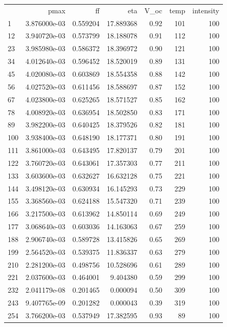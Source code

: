 \documentclass[a4paper,12pt]{article}
\begin{document}
\begin{tabular}{lrrrrrr}

{} &          pmax &        ff &        eta &  V\_oc &  temp &  intensity \\

1   &  3.876000e-03 &  0.559204 &  17.889368 &  0.92 &   101 &        100 \\
12  &  3.940720e-03 &  0.573799 &  18.188078 &  0.91 &   112 &        100 \\
23  &  3.985980e-03 &  0.586372 &  18.396972 &  0.90 &   121 &        100 \\
34  &  4.012640e-03 &  0.596452 &  18.520019 &  0.89 &   131 &        100 \\
45  &  4.020080e-03 &  0.603869 &  18.554358 &  0.88 &   142 &        100 \\
56  &  4.027520e-03 &  0.611456 &  18.588697 &  0.87 &   152 &        100 \\
67  &  4.023800e-03 &  0.625265 &  18.571527 &  0.85 &   162 &        100 \\
78  &  4.008920e-03 &  0.636954 &  18.502850 &  0.83 &   171 &        100 \\
89  &  3.982200e-03 &  0.640425 &  18.379526 &  0.82 &   181 &        100 \\
100 &  3.938400e-03 &  0.648190 &  18.177371 &  0.80 &   191 &        100 \\
111 &  3.861000e-03 &  0.643495 &  17.820137 &  0.79 &   201 &        100 \\
122 &  3.760720e-03 &  0.643061 &  17.357303 &  0.77 &   211 &        100 \\
133 &  3.603600e-03 &  0.632627 &  16.632128 &  0.75 &   221 &        100 \\
144 &  3.498120e-03 &  0.630934 &  16.145293 &  0.73 &   229 &        100 \\
155 &  3.368560e-03 &  0.624188 &  15.547320 &  0.71 &   239 &        100 \\
166 &  3.217500e-03 &  0.613962 &  14.850114 &  0.69 &   249 &        100 \\
177 &  3.068640e-03 &  0.603036 &  14.163063 &  0.67 &   259 &        100 \\
188 &  2.906740e-03 &  0.589728 &  13.415826 &  0.65 &   269 &        100 \\
199 &  2.564520e-03 &  0.539375 &  11.836337 &  0.63 &   279 &        100 \\
210 &  2.281200e-03 &  0.498756 &  10.528696 &  0.61 &   289 &        100 \\
221 &  2.037600e-03 &  0.464001 &   9.404380 &  0.59 &   299 &        100 \\
232 &  2.041179e-08 &  0.201465 &   0.000094 &  0.50 &   309 &        100 \\
243 &  9.407765e-09 &  0.201282 &   0.000043 &  0.39 &   319 &        100 \\
254 &  3.766200e-03 &  0.537949 &  17.382595 &  0.93 &    89 &        100 \\

\end{tabular}
\end{document}

